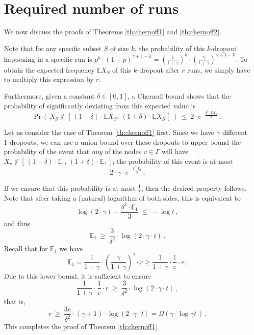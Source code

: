 \documentclass{article}
\begin{document}
\section{Required number of runs} \label{app:Chernoff}

We now discuss the proofs of Theorems \ref{th:chernoff1} and \ref{th:chernoff2}.

Note that for any specific subset $S$ of size $k$, the probability of this $k$-dropout happening in a specific run is $p^k \cdot (1-p)^{\gamma+1-k} = \left( \frac{1}{1+\gamma} \right)^k \cdot \left( \frac{\gamma}{1+\gamma} \right)^{\gamma+1-k}$. To obtain the expected frequency $\mathbb{E} X_S$ of this $k$-dropout after $r$ runs, we simply have to multiply this expression by $r$.

Furthermore, given a constant $\delta \in [0, 1]$, a Chernoff bound shows that the probability of significantly deviating from this expected value is
\[ \text{Pr}\,\left(\, X_S \notin [\, (1\!-\!\delta) \cdot \mathbb{E} X_S, \, (1\!+\!\delta) \cdot \mathbb{E} X_S \, ] \, \right) \: \leq \: 2 \cdot e ^{- \frac{\delta^2 \cdot \mathbb{E} X_S}{3}} \, . \]

Let us consider the case of Theorem \ref{th:chernoff1} first. Since we have $\gamma$ different $1$-dropouts, we can use a union bound over these dropouts to upper bound the probability of the event that \textit{any} of the nodes $v \in \Gamma$ will have $X_v \notin [\, (1\!-\!\delta) \cdot \mathbb{E}_1, \, (1\!+\!\delta) \cdot \mathbb{E}_1 \, ]$; the probability of this event is at most
\[ 2 \cdot \gamma \cdot e ^ {- \frac{\delta^2 \cdot \mathbb{E}_1}{3}} \, . \]

If we ensure that this probability is at most $\frac{1}{t}$, then the desired property follows. Note that after taking a (natural) logarithm of both sides, this is equivalent to
\[ \log ( 2 \cdot \gamma ) - \frac{\delta^2 \cdot \mathbb{E}_1}{3} \: \leq \: - \log{t} \, , \]
and thus
\[ \mathbb{E}_1 \: \geq \: \frac{3}{\delta^2}  \cdot \log ( 2 \cdot \gamma \cdot t) \, . \]
Recall that for $\mathbb{E}_1$ we have 
\[ \mathbb{E}_1= \frac{1}{1+\gamma} \cdot \left( \frac{\gamma}{1+\gamma} \right)^{\gamma} \cdot r \geq \frac{1}{1+\gamma} \cdot \frac{1}{e} \cdot r \, . \]
Due to this lower bound, it is sufficient to ensure
\[ \frac{1}{1+\gamma} \cdot \frac{1}{e} \cdot r \: \geq \: \frac{3}{\delta^2}  \cdot \log ( 2 \cdot \gamma \cdot t) \, , \]
that is,
\[ r \: \geq \: \frac{3e}{\delta^2} \cdot (\gamma+1)  \cdot \log ( 2 \cdot \gamma \cdot t) = \Omega(\gamma \cdot \log \gamma t _{\,} ) \, . \]
This completes the proof of Theorem \ref{th:chernoff1}.
\end{document}
